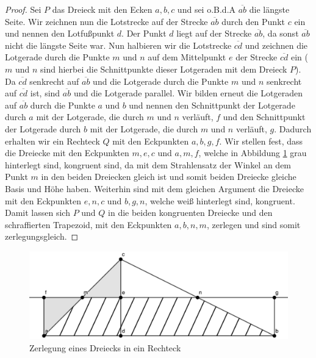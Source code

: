 \documentclass[11pt,titlepage]{article}
\theoremstyle{definition}
\theoremstyle{remark}
\begin{document}
	\begin{proof}
		Sei $P$ das Dreieck mit den Ecken $a,b,c$ und sei o.B.d.A $\overline{ab}$ die längste Seite. Wir zeichnen 
		nun die Lotstrecke auf der Strecke $\overline{ab}$ durch den Punkt $c$ ein und nennen den Lotfußpunkt $d$. 
		Der Punkt $d$ liegt auf der Strecke $\overline{ab}$, da sonst $\overline{ab}$ nicht die längste Seite war. 
		Nun halbieren wir die Lotstrecke $\overline{cd}$ und zeichnen die Lotgerade durch die Punkte $m$ und $n$ 
		auf dem Mittelpunkt $e$ der Strecke $\overline{cd}$ ein ($m$ und $n$ sind hierbei die Schnittpunkte 
		dieser Lotgeraden mit dem Dreieck $P$). Da $\overline{cd}$ senkrecht auf $\overline{ab}$ und die Lotgerade 
		durch die Punkte $m$ und $n$ 
		senkrecht auf $\overline{cd}$ ist, sind $\overline{ab}$ und die Lotgerade parallel. Wir bilden erneut die 
		Lotgeraden auf $\overline{ab}$ durch die Punkte $a$ und $b$ und nennen den Schnittpunkt der Lotgerade 
		durch $a$ mit der Lotgerade, die durch $m$ und $n$ verläuft, $f$ und den Schnittpunkt der Lotgerade durch 
		$b$ mit der Lotgerade, die durch $m$ und $n$ verläuft, $g$. Dadurch erhalten wir ein Rechteck $Q$ mit den 
		Eckpunkten $a,b,g,f$. Wir stellen fest, dass die Dreiecke mit den Eckpunkten $m,e,c$ und $a,m,f$, welche in 
		Abbildung \ref{Abb.1} grau hinterlegt sind, kongruent sind, da mit dem Strahlensatz der Winkel an dem 
		Punkt $m$ in den beiden Dreiecken gleich ist und somit beiden Dreiecke gleiche Basis und Höhe haben. 
		Weiterhin sind mit dem gleichen Argument die Dreiecke mit den Eckpunkten $e,n,c$ und $b,g,n$, welche weiß 
		hinterlegt sind, kongruent. Damit lassen sich $P$ und $Q$ in die beiden 
		kongruenten Dreiecke und den schraffierten Trapezoid, mit den Eckpunkten $a,b,n,m$, zerlegen und sind somit 
		zerlegungsgleich.
	\end{proof}
	
	\begin{figure}[!htbp]
		\centering
		\includegraphics[scale=1.6]{DreieckLemma}
		\caption{Zerlegung eines Dreiecks in ein Rechteck}
		\label{Abb.1}
	\end{figure}
	
\end{document}
